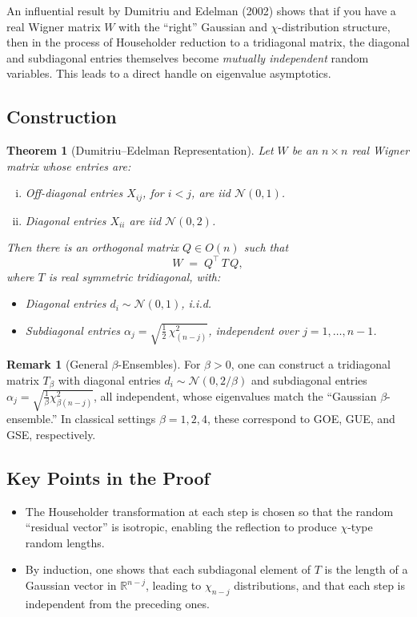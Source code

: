 \documentclass[letterpaper,11pt,oneside,reqno]{article}
\numberwithin{equation}{section}
\newtheorem{theorem}[proposition]{Theorem}
\theoremstyle{definition}
\newtheorem{remark}[proposition]{Remark}
\begin{document}
An influential result by Dumitriu and Edelman (2002) shows that if you have a real Wigner matrix $W$ with the “right” Gaussian and $\chi$-distribution structure, then in the process of Householder reduction to a tridiagonal matrix, the diagonal and subdiagonal entries themselves become \emph{mutually independent} random variables. This leads to a direct handle on eigenvalue asymptotics.

\subsection{Construction}

\begin{theorem}[Dumitriu--Edelman Representation]
\label{thm:DE-representation}
Let $W$ be an $n \times n$ real Wigner matrix whose entries are:
\begin{enumerate}[(i)]
\item Off-diagonal entries $X_{ij}$, for $i<j$, are iid $\mathcal{N}(0,1)$.
\item Diagonal entries $X_{ii}$ are iid $\mathcal{N}(0,2)$.
\end{enumerate}
Then there is an orthogonal matrix $Q \in O(n)$ such that
\[
  W \;=\; Q^\top \, T\, Q,
\]
where $T$ is real symmetric tridiagonal, with:
\begin{itemize}
\item Diagonal entries $d_i \sim \mathcal{N}(0,1)$, i.i.d.
\item Subdiagonal entries $\displaystyle \alpha_j = \sqrt{\frac12 \,\chi^2_{(n-j)}}$, independent over $j=1,\ldots,n-1$.
\end{itemize}
\end{theorem}

\begin{remark}[General $\beta$-Ensembles]
For $\beta>0$, one can construct a tridiagonal matrix $T_\beta$ with diagonal entries $d_i \sim \mathcal{N}(0,2/\beta)$ and subdiagonal entries $\alpha_j = \sqrt{\frac{1}{\beta}\chi^2_{\beta(n-j)}}$, all independent, whose eigenvalues match the “Gaussian $\beta$-ensemble.” In classical settings $\beta=1,2,4$, these correspond to GOE, GUE, and GSE, respectively.
\end{remark}

\subsection{Key Points in the Proof}

\begin{itemize}
\item The Householder transformation at each step is chosen so that the random “residual vector” is isotropic, enabling the reflection to produce $\chi$-type random lengths.
\item By induction, one shows that each subdiagonal element of $T$ is the length of a Gaussian vector in $\mathbb{R}^{n-j}$, leading to $\chi_{n-j}$ distributions, and that each step is independent from the preceding ones.
\end{itemize}
\end{document}
